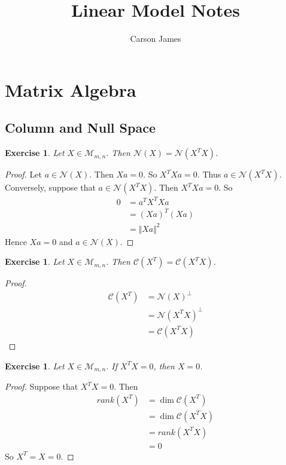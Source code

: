 \documentclass[12pt]{amsart}
\newtheorem{ex}[thm]{Exercise}
\newcommand{\MC}{\mathcal{C}}
\newcommand{\MN}{\mathcal{N}}
\newcommand{\MM}{\mathcal{M}}
\newcommand{\z}[1]{Let ${#1} \in \MM_{m,n}$}
\newcommand{\n}{\Vert}
\begin{document}
\title{Linear Model Notes}
\author[James]{Carson James}
\maketitle

\tableofcontents

\section{Matrix Algebra}

\subsection{Column and Null Space}

\begin{ex}
Let $X \in \MM_{m,n}$. Then $\MN(X) = \MN(X^TX)$.
\end{ex}

\begin{proof}
Let $a \in \MN(X)$. Then $Xa = 0$. So $X^TXa = 0$. Thus $a \in \MN(X^TX)$. Conversely, suppose that $a \in \MN(X^TX)$. Then $X^TXa = 0$. So 
\begin{align*}
0 
&= a^TX^TXa \\
&= (Xa)^T(Xa) \\
&= \n Xa \n^2 
\end{align*}
Hence $Xa = 0$ and $a \in \MN(X)$.
\end{proof}

\begin{ex}
Let $X \in \MM_{m,n}$. Then $\MC(X^T) = \MC(X^TX)$.
\end{ex}

\begin{proof}
\begin{align*}
\MC(X^T) 
&= \MN(X)^{\perp} \\
&= \MN(X^TX)^{\perp} \\
&= \MC(X^T X)
\end{align*}
\end{proof}

\begin{ex}
\z{X}. If $X^TX = 0$, then $X = 0$.
\end{ex}

\begin{proof}
Suppose that $X^TX = 0$. Then 
\begin{align*}
rank(X^T)
&= \dim \MC(X^T) \\
&= \dim \MC(X^TX) \\
&= rank(X^TX) \\
&= 0
\end{align*}
So $X^T = X = 0$.
\end{proof}
\end{document}
